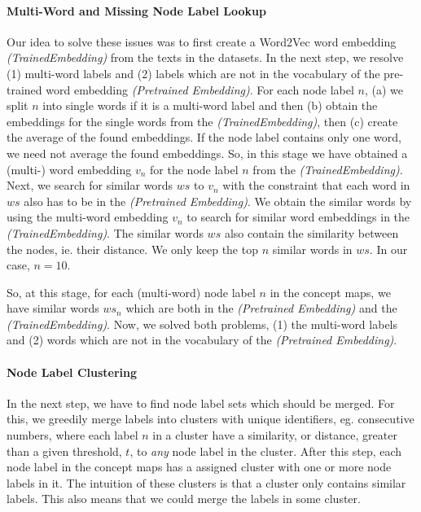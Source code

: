 \paragraph{Multi-Word and Missing Node Label Lookup}
Our idea to solve these issues was to first create a Word2Vec \cite{Mikolov2013} word embedding \textit{(TrainedEmbedding)} from the texts in the datasets.
In the next step, we resolve (1) multi-word labels and (2) labels which are not in the vocabulary of the pre-trained word embedding \textit{(Pretrained Embedding)}.
For each node label $n$, (a) we split $n$ into single words if it is a multi-word label and then (b) obtain the embeddings for the single words from the \textit{(TrainedEmbedding)}, then (c) create the average of the found embeddings.
If the node label contains only one word, we need not average the found embeddings.
So, in this stage we have obtained a (multi-) word embedding $v_n$ for the node label $n$ from the  \textit{(TrainedEmbedding)}.
Next, we search for similar words $ws$ to $v_n$ with the constraint that each word in $ws$ also has to be in the \textit{(Pretrained Embedding)}.
We obtain the similar words by using the multi-word embedding $v_n$ to search for similar word embeddings in the \textit{(TrainedEmbedding)}.
The similar words $ws$ also contain the similarity between the nodes, ie. their distance.
We only keep the top $n$ similar words in $ws$. In our case, $n = 10$.

So, at this stage, for each (multi-word) node label $n$ in the concept maps, we have similar words $ws_n$ which are both in the \textit{(Pretrained Embedding)} and the \textit{(TrainedEmbedding)}.
Now, we solved both problems, (1) the multi-word labels and (2) words which are not in the vocabulary of the \textit{(Pretrained Embedding)}.

\paragraph{Node Label Clustering}
In the next step, we have to find node label sets which should be merged.
For this, we greedily merge labels into clusters with unique identifiers, eg. consecutive numbers, where each label $n$ in a cluster have a similarity, or distance, greater than a given threshold, $t$, to \textit{any} node label in the cluster.
After this step, each node label in the concept maps has a assigned cluster with one or more node labels in it.
The intuition of these clusters is that a cluster only contains similar labels.
This also means that we could merge the labels in some cluster.

